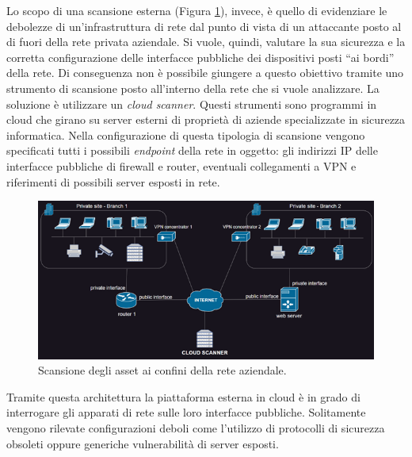 \documentclass[target=bach,aauheader=]{thud}
\begin{document}
Lo scopo di una scansione esterna (Figura \ref{fig:scan_esterna}), invece, è quello di evidenziare le debolezze di un’infrastruttura di rete dal punto di vista di un attaccante posto al di fuori della rete privata aziendale. Si vuole, quindi, valutare la sua sicurezza e la corretta configurazione delle interfacce pubbliche dei dispositivi posti “ai bordi” della rete. Di conseguenza non è possibile giungere a questo obiettivo tramite uno strumento di scansione posto all’interno della rete che si vuole analizzare. La soluzione è utilizzare un \textit{cloud scanner}. Questi strumenti sono programmi in cloud che girano su server esterni di proprietà di aziende specializzate in sicurezza informatica. Nella configurazione di questa tipologia di scansione vengono specificati tutti i possibili \textit{endpoint} della rete in oggetto: gli indirizzi IP delle interfacce pubbliche di firewall e router, eventuali collegamenti a VPN e riferimenti di possibili server esposti in rete.


\begin{figure}[h]
\label{fig:scan_esterna}
\centering
\includegraphics[scale=1.2]{images/scan_esterna.png}
    \caption{Scansione degli asset ai confini della rete aziendale.}
\end{figure}


Tramite questa architettura la piattaforma esterna in cloud è in grado di interrogare gli apparati di rete sulle loro interfacce pubbliche. Solitamente vengono rilevate configurazioni deboli come l’utilizzo di protocolli di sicurezza obsoleti oppure generiche vulnerabilità di server esposti.
\end{document}
